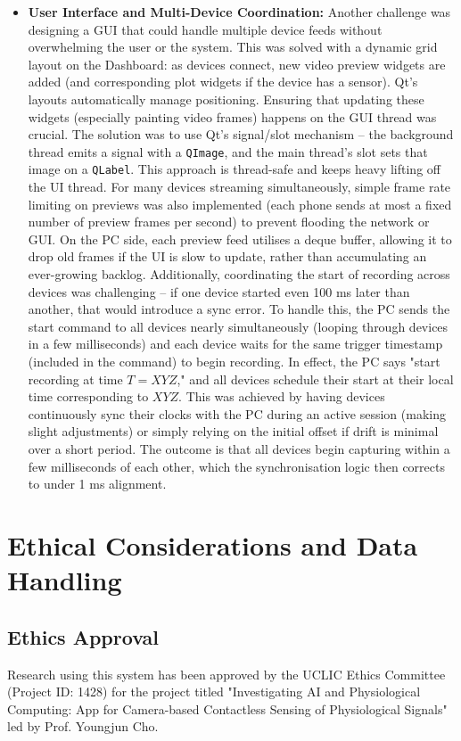 \begin{itemize}
	\item \textbf{User Interface and Multi-Device Coordination:} Another challenge was designing a GUI that could handle multiple device feeds without overwhelming the user or the system. This was solved with a dynamic grid layout on the Dashboard: as devices connect, new video preview widgets are added (and corresponding plot widgets if the device has a sensor). Qt's layouts automatically manage positioning. Ensuring that updating these widgets (especially painting video frames) happens on the GUI thread was crucial. The solution was to use Qt's signal/slot mechanism -- the background thread emits a signal with a \texttt{QImage}, and the main thread's slot sets that image on a \texttt{QLabel}. This approach is thread-safe and keeps heavy lifting off the UI thread. For many devices streaming simultaneously, simple frame rate limiting on previews was also implemented (each phone sends at most a fixed number of preview frames per second) to prevent flooding the network or GUI. On the PC side, each preview feed utilises a deque buffer, allowing it to drop old frames if the UI is slow to update, rather than accumulating an ever-growing backlog. Additionally, coordinating the start of recording across devices was challenging -- if one device started even 100 ms later than another, that would introduce a sync error. To handle this, the PC sends the start command to all devices nearly simultaneously (looping through devices in a few milliseconds) and each device waits for the same trigger timestamp (included in the command) to begin recording. In effect, the PC says "start recording at time $T = XYZ$," and all devices schedule their start at their local time corresponding to $XYZ$. This was achieved by having devices continuously sync their clocks with the PC during an active session (making slight adjustments) or simply relying on the initial offset if drift is minimal over a short period. The outcome is that all devices begin capturing within a few milliseconds of each other, which the synchronisation logic then corrects to under 1 ms alignment.
\end{itemize}


\section{Ethical Considerations and Data Handling}\label{sec:4-7}

\subsection{Ethics Approval}
Research using this system has been approved by the UCLIC Ethics Committee (Project ID: 1428) for the project titled "Investigating AI and Physiological Computing: App for Camera-based Contactless Sensing of Physiological Signals" led by Prof. Youngjun Cho.

